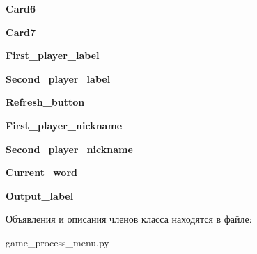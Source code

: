 \begin{DoxyCompactItemize}
\mbox{\label{classgame__process__menu_1_1_ui___main_window_a63579e3810024515d2062d3bb53a6b96}} 
{\bfseries Card6}
\item 
\mbox{\label{classgame__process__menu_1_1_ui___main_window_a48cca9daf6b410f491673ad7159929b5}} 
{\bfseries Card7}
\item 
\mbox{\label{classgame__process__menu_1_1_ui___main_window_a2537ea406e32bcc8557acf04c8900c5d}} 
{\bfseries First\+\_\+player\+\_\+label}
\item 
\mbox{\label{classgame__process__menu_1_1_ui___main_window_a0373f61bb40a4dc408971e37e2c47fa1}} 
{\bfseries Second\+\_\+player\+\_\+label}
\item 
\mbox{\label{classgame__process__menu_1_1_ui___main_window_a635cfe75923bc518a4a95d1903dc0652}} 
{\bfseries Refresh\+\_\+button}
\item 
\mbox{\label{classgame__process__menu_1_1_ui___main_window_abd78a9b7767e3088ed23a513c12c81e7}} 
{\bfseries First\+\_\+player\+\_\+nickname}
\item 
\mbox{\label{classgame__process__menu_1_1_ui___main_window_a8fe1437ccc7615aeda98533be6f14bb6}} 
{\bfseries Second\+\_\+player\+\_\+nickname}
\item 
\mbox{\label{classgame__process__menu_1_1_ui___main_window_a51d0ef04ebaca1d1125dc9f3ea7c66aa}} 
{\bfseries Current\+\_\+word}
\item 
\mbox{\label{classgame__process__menu_1_1_ui___main_window_a8e4ea1055cc461b3e252c0c75b187479}} 
{\bfseries Output\+\_\+label}
\end{DoxyCompactItemize}


Объявления и описания членов класса находятся в файле\+:\begin{DoxyCompactItemize}
\item 
game\+\_\+process\+\_\+menu.\+py\end{DoxyCompactItemize}

